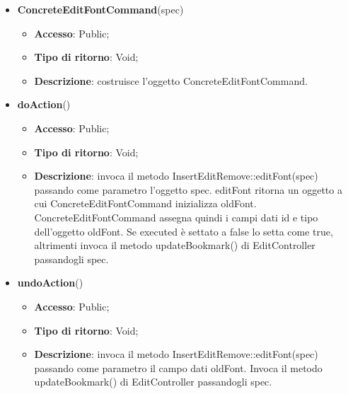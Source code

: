 {{{\begin{itemize}
\begin{itemize}
\begin{itemize}
		\end{itemize}
			\end{itemize}
			\end{itemize}
		\begin{itemize}
			\item \textbf{ConcreteEditFontCommand}(spec)
			\begin{itemize}
				\item \textbf{Accesso}: Public;
				\item \textbf{Tipo di ritorno}: Void;
				\item \textbf{Descrizione}: costruisce l’oggetto ConcreteEditFontCommand.
			\end{itemize}
			\item \textbf{doAction}()
			\begin{itemize}
				\item \textbf{Accesso}: Public;
				\item \textbf{Tipo di ritorno}: Void;
				\item \textbf{Descrizione}: invoca il metodo InsertEditRemove::editFont(spec) passando come parametro l'oggetto spec. editFont ritorna un oggetto a cui ConcreteEditFontCommand inizializza oldFont. ConcreteEditFontCommand assegna quindi i campi dati id e tipo dell'oggetto oldFont. Se executed è settato a false lo setta come true, altrimenti invoca il metodo updateBookmark() di EditController passandogli spec.
			\end{itemize}
			\item \textbf{undoAction}()
			\begin{itemize}
				\item \textbf{Accesso}: Public;
				\item \textbf{Tipo di ritorno}: Void;
				\item \textbf{Descrizione}: invoca il metodo InsertEditRemove::editFont(spec) passando come parametro il campo dati oldFont. Invoca il metodo updateBookmark() di EditController passandogli spec.
			\end{itemize}
		\end{itemize}
}

}}
